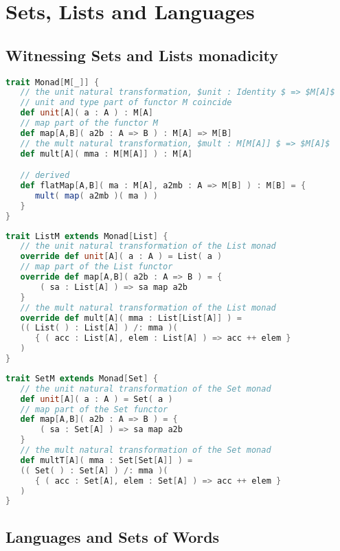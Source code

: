 \section{Sets, Lists and Languages}

\subsection{Witnessing Sets and Lists monadicity}

\begin{lstlisting}[language=Scala,mathescape=true]
trait Monad[M[_]] {
   // the unit natural transformation, $unit : Identity $ => $M[A]$
   // unit and type part of functor M coincide
   def unit[A]( a : A ) : M[A]
   // map part of the functor M
   def map[A,B]( a2b : A => B ) : M[A] => M[B]
   // the mult natural transformation, $mult : M[M[A]] $ => $M[A]$   
   def mult[A]( mma : M[M[A]] ) : M[A]

   // derived
   def flatMap[A,B]( ma : M[A], a2mb : A => M[B] ) : M[B] = {
      mult( map( a2mb )( ma ) )
   }
}
\end{lstlisting}

\break
\begin{lstlisting}[language=Scala,mathescape=true]
trait ListM extends Monad[List] {  
   // the unit natural transformation of the List monad
   override def unit[A]( a : A ) = List( a )
   // map part of the List functor
   override def map[A,B]( a2b : A => B ) = {
       ( sa : List[A] ) => sa map a2b
   }
   // the mult natural transformation of the List monad
   override def mult[A]( mma : List[List[A]] ) =
   (( List( ) : List[A] ) /: mma )(
      { ( acc : List[A], elem : List[A] ) => acc ++ elem }
   )
}
\end{lstlisting}

\begin{lstlisting}[language=Scala,mathescape=true]
trait SetM extends Monad[Set] {
   // the unit natural transformation of the Set monad
   def unit[A]( a : A ) = Set( a )
   // map part of the Set functor
   def map[A,B]( a2b : A => B ) = {
       ( sa : Set[A] ) => sa map a2b
   }
   // the mult natural transformation of the Set monad
   def multT[A]( mma : Set[Set[A]] ) =
   (( Set( ) : Set[A] ) /: mma )(
      { ( acc : Set[A], elem : Set[A] ) => acc ++ elem }
   )
}
\end{lstlisting}

\subsection{Languages and Sets of Words}

